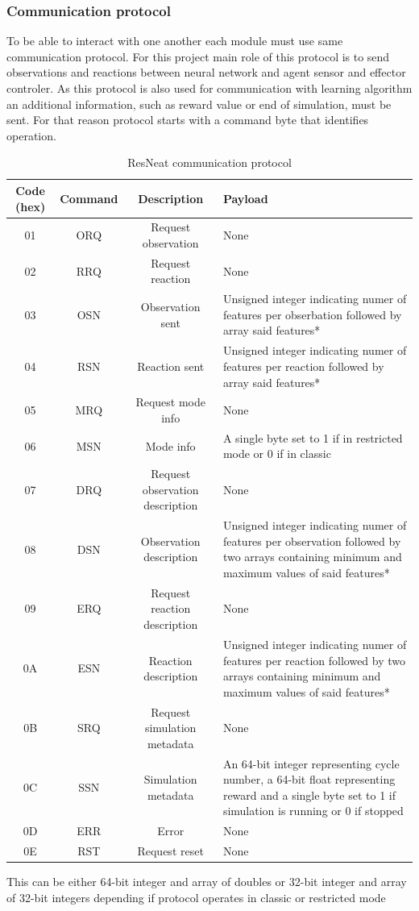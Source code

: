 \subsubsection{Communication protocol}
To be able to interact with one another each module must use same communication protocol.
For this project main role of this protocol is to send observations and reactions between 
neural network and agent sensor and effector controler.
As this protocol is also used for communication with learning algorithm an additional information,
such as reward value or end of simulation, must be sent.
For that reason protocol starts with a command byte that identifies operation.
\begin{table} 
	\centering
	\caption{ResNeat communication protocol}
	\label{tab:resneat-protocol}
	\begin{tabularx}{\textwidth}{cccX}
		\hline
		\hline
		Code (hex)& Command& Description& Payload\\
		\hline
		01& ORQ&  Request observation& None\\
		02& RRQ& Request reaction& None\\
		03& OSN& Observation sent& Unsigned integer indicating numer of features per obserbation 
		followed by array said features*\\
		04& RSN& Reaction sent& Unsigned integer indicating numer of features per reaction 
		followed by array said features*\\
		05& MRQ& Request mode info& None\\
		06& MSN& Mode info& A single byte set to 1 if in restricted mode or 0 if in classic\\
		07& DRQ& Request observation description& None\\
		08& DSN& Observation description& Unsigned integer indicating numer of features per observation 
		followed by two arrays containing minimum and maximum values of  said features*\\
		09& ERQ& Request reaction description& None\\
		0A& ESN& Reaction description& Unsigned integer indicating numer of features per reaction 
		followed by two arrays containing minimum and maximum values of  said features*\\
		0B& SRQ& Request simulation metadata& None\\
		0C& SSN& Simulation metadata& An 64-bit integer representing cycle number, a 64-bit float 
		representing reward and a single byte set to 1 if simulation is running or 0 if stopped\\
		0D& ERR& Error& None\\
		0E& RST& Request reset& None\\

		\hline
		\hline
	\end{tabularx}
	\newline
	{\footnotesize *This can be either 64-bit integer and array of doubles or 32-bit integer
	and array of 32-bit integers depending if protocol operates in classic or restricted mode}
\end{table}

